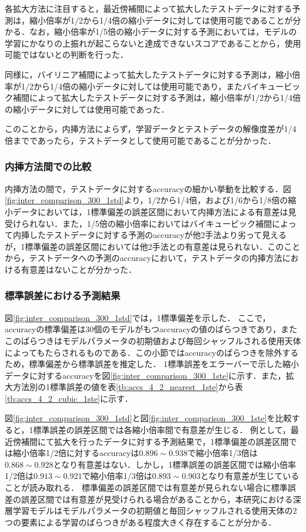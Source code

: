 \documentclass[a4j, 11pt]{jreport}
\begin{document}
各拡大方法に注目すると，最近傍補間によって拡大したテストデータに対する予測は，縮小倍率が1/2から1/4倍の縮小データに対しては使用可能であることが分かる．なお，縮小倍率が1/5倍の縮小データに対する予測においては，モデルの学習にかなりの上振れが起こらないと達成できないスコアであることから，使用可能ではないとの判断を行った．

同様に，バイリニア補間によって拡大したテストデータに対する予測は，縮小倍率が1/2から1/4倍の縮小データに対しては使用可能であり，またバイキュービック補間によって拡大したテストデータに対する予測は，縮小倍率が1/2から1/4倍の縮小データに対しては使用可能であった．

このことから，内挿方法によらず，学習データとテストデータの解像度差が1/4倍までであったら，テストデータとして使用可能であることが分かった．

\subsubsection{内挿方法間での比較}
内挿方法の間で，テストデータに対するaccuracyの細かい挙動を比較する．図\ref{fig:inter_comparison_300_1std}より，1/2から1/4倍，および1/6から1/8倍の縮小データにおいては，1標準偏差の誤差区間において内挿方法による有意差は見受けられない．また，1/5倍の縮小倍率においてはバイキュービック補間によって内挿したテストデータに対する予測のaccuracyが他2手法より劣って見えるが，1標準偏差の誤差区間においては他2手法との有意差は見られない．このことから，テストデータへの予測のaccuracyにおいて，テストデータの内挿方法における有意差はないことが分かった．

\subsubsection{標準誤差における予測結果}
図\ref{fig:inter_comparison_300_1std}では，1標準偏差を示した．
ここで，accuracyの標準偏差は30個のモデルがもつaccuracyの値のばらつきであり，またこのばらつきはモデルパラメータの初期値および毎回シャッフルされる使用天体によってもたらされるものである．この小節ではaccuracyのばらつきを除外するため，標準偏差から標準誤差を推定した．
1標準誤差をエラーバーで示した縮小データに対するaccuracyを図\ref{fig:inter_comparison_300_1ste}に示す．また，拡大方法別の1標準誤差の値を表\ref{tb:accs_4_2_nearest_1ste}から表\ref{tb:accs_4_2_cubic_1ste}に示す．

図\ref{fig:inter_comparison_300_1std}と図\ref{fig:inter_comparison_300_1ste}を比較すると，1標準誤差の誤差区間では各縮小倍率間で有意差が生じる．
例として，最近傍補間にて拡大を行ったデータに対する予測結果で，1標準偏差の誤差区間では縮小倍率1/2倍に対するaccuracyは$0.896 \sim 0.938$で縮小倍率1/3倍は$0.868 \sim 0.928$となり有意差はない．しかし，1標準誤差の誤差区間では縮小倍率1/2倍は$0.913 \sim 0.921$で縮小倍率1/3倍は$0.893 \sim 0.903$となり有意差が生じていることが読み取れる．
標準偏差の誤差区間では有意差が見られない場合に標準誤差の誤差区間では有意差が見受けられる場合があることから，本研究における深層学習モデルはモデルパラメータの初期値と毎回シャッフルされる使用天体の2つの要素による学習のばらつきがある程度大きく存在することが分かる．
\end{document}

